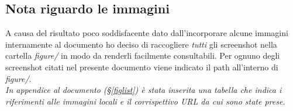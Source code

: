 \subsection{Nota riguardo le immagini}
A causa del risultato poco soddisfacente dato dall'incorporare alcune immagini internamente al documento ho deciso di raccogliere \textit{tutti} gli screenshot nella cartella \textit{figure/} in modo da renderli facilmente consultabili. 
Per ognuno degli screenshot citati nel presente documento viene indicato il path all'interno di \textit{figure/}. \\
\textit{In appendice al documento (§\ref{figlist}) è stata inserita una tabella che indica i riferimenti
alle immagini locali e il corrispettivo URL da cui sono state prese}.